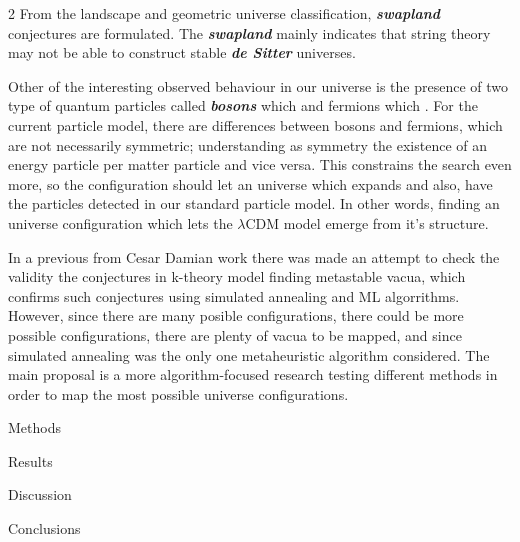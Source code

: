 \documentclass[]{papertexKS}
\begin{document}
\begin{news}{2}
From the landscape and geometric universe classification, \textit{\textbf{swapland}} conjectures are formulated. The \textit{\textbf{swapland}} mainly indicates that string theory may not be able to construct stable \textit{\textbf{de Sitter}} universes.

Other of the interesting observed behaviour in our universe is the presence of two type of quantum particles called \textbf{\textit{bosons}} which  and fermions which . For the current particle model, there are differences between bosons and fermions, which are not necessarily symmetric; understanding as symmetry the existence of an energy particle per matter particle and vice versa. This constrains the search even more, so the configuration should let an universe which expands and also, have the particles detected in our standard particle model. In other words, finding an universe configuration which lets the $\lambda$CDM model emerge from it's structure.

In a previous from Cesar Damian \cite{Damian2022} work there was made an attempt to check the validity the conjectures in k-theory model finding metastable vacua, which confirms such conjectures using simulated annealing and ML algorrithms. However, since there are many posible configurations, there could be more possible configurations, there are plenty of vacua to be mapped, and since simulated annealing was the only one metaheuristic algorithm considered. The main proposal is a more algorithm-focused research testing different methods in order to map the most possible universe configurations.


\noindent\textcolor{color}{\Large{Methods}} \label{sec:methods}

\noindent\textcolor{color}{\Large{Results}} \label{sec: results}

\noindent\textcolor{color}{\Large{Discussion}} \label{sec: discussion}

\noindent\textcolor{color}{\Large{Conclusions}} \label{sec: conclusions}

\printbibliography[]
\end{news}
\end{document}

